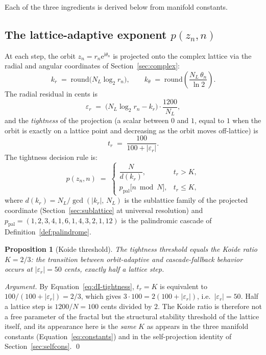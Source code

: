 \documentclass[11pt,a4paper]{article}
\newtheorem{proposition}[theorem]{Proposition}
\theoremstyle{definition}
\theoremstyle{remark}
\begin{document}
Each of the three ingredients is derived below from manifold constants.

\subsection{The lattice-adaptive exponent $p(z_{n},n)$}\label{subsec:dI-exponent}

At each step, the orbit $z_{n}=r_{n}\mathrm{e}^{\mathrm{i}\theta_{n}}$ is projected onto the complex lattice via the radial and angular coordinates of Section~\ref{sec:complex}:
\begin{equation}
k_{r} \;=\; \mathrm{round}\bigl(N_{L}\log_{2}r_{n}\bigr), \qquad
k_{\theta} \;=\; \mathrm{round}\!\left(\frac{N_{L}\,\theta_{n}}{\ln 2}\right).
\end{equation}
The radial residual in cents is
\begin{equation}
\varepsilon_{r} \;=\; \bigl(N_{L}\log_{2}r_{n} - k_{r}\bigr)\cdot\frac{1200}{N_{L}},
\label{eq:dI-eps}
\end{equation}
and the \emph{tightness} of the projection (a scalar between $0$ and $1$, equal to $1$ when the orbit is exactly on a lattice point and decreasing as the orbit moves off-lattice) is
\begin{equation}
t_{r} \;=\; \frac{100}{100+|\varepsilon_{r}|}.
\label{eq:dI-tightness}
\end{equation}
The tightness decision rule is:
\[
p(z_{n},n) \;=\; \begin{cases}
\dfrac{N}{d(k_{r})}, & t_{r} > K, \\[0.8em]
p_{\mathrm{pal}}\!\bigl[n\bmod N\bigr], & t_{r} \leq K,
\end{cases}
\]
where $d(k_{r}) = N_{L}/\gcd(|k_{r}|,\,N_{L})$ is the sublattice family of the projected coordinate (Section~\ref{sec:sublattice} at universal resolution) and $p_{\mathrm{pal}}=(1,2,3,4,1,6,1,4,3,2,1,12)$ is the palindromic cascade of Definition~\ref{def:palindrome}.

\begin{proposition}[Koide threshold]\label{prop:koide-threshold}
The tightness threshold equals the Koide ratio $K=2/3$: the transition between orbit-adaptive and cascade-fallback behavior occurs at $|\varepsilon_{r}| = 50$ cents, exactly half a lattice step.
\end{proposition}

\begin{proof}[Argument]
By Equation~\eqref{eq:dI-tightness}, $t_{r} = K$ is equivalent to $100/(100+|\varepsilon_{r}|) = 2/3$, which gives $3\cdot 100 = 2(100+|\varepsilon_{r}|)$, i.e.\ $|\varepsilon_{r}|=50$. Half a lattice step is $1200/N = 100$ cents divided by $2$. The Koide ratio is therefore not a free parameter of the fractal but the structural stability threshold of the lattice itself, and its appearance here is the \emph{same} $K$ as appears in the three manifold constants (Equation~\eqref{eq:constants}) and in the self-projection identity of Section~\ref{sec:selfcons}. \qed
\end{proof}
\end{document}
